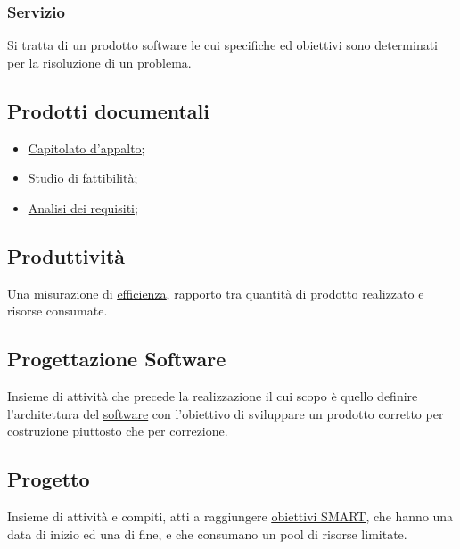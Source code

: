 		\subsubsection{Servizio}
		Si tratta di un prodotto software le cui specifiche ed obiettivi sono determinati per la risoluzione di un problema.

	\subsection{Prodotti documentali}
	\label{sec:prodottidocumentali}
	\begin{itemize}
	\item \underline{\hyperref[sec:capitolato]{Capitolato d'appalto};}
	\item \underline{\hyperref[sec:studiofattibilita]{Studio di fattibilità}};
	\item \underline{\hyperref[sec:analisirequisiti]{Analisi dei requisiti}};
	\end{itemize}

	\subsection{Produttività}
	\label{sec:produttivita}
	Una misurazione di \underline{\hyperref[sec:efficienza]{efficienza}}, rapporto tra quantità di prodotto realizzato e risorse consumate.

	\subsection{Progettazione Software}
	\label{sec:progettazionesoftware}
	Insieme di attività che precede la realizzazione il cui scopo è quello definire l'architettura del \underline{\hyperref[sec:prodottosoftware]{software}} con l'obiettivo di sviluppare un prodotto corretto per costruzione piuttosto che per correzione.

	\subsection{Progetto}
	\label{sec:progetto}
	Insieme di attività e compiti, atti a raggiungere \underline{\hyperref[sec:smart]{obiettivi SMART}}, che hanno una data di inizio ed una di fine, e che consumano un pool di risorse limitate.

